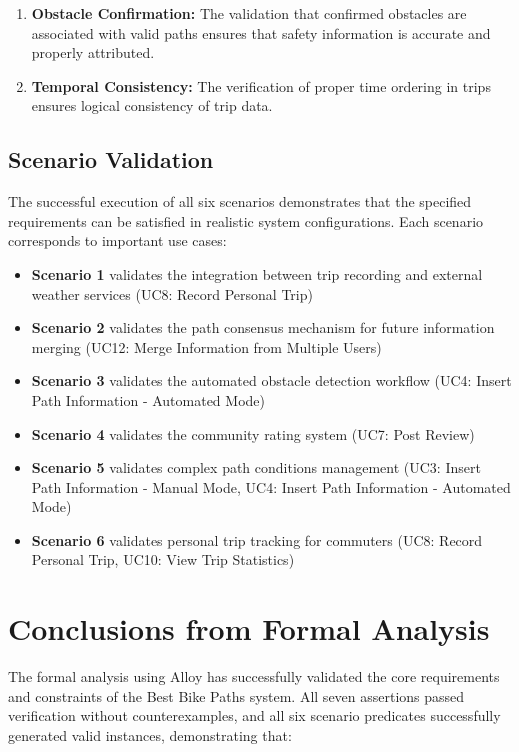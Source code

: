 \begin{enumerate}
    \item \textbf{Obstacle Confirmation:} The validation that confirmed obstacles are associated with valid paths ensures that safety information is accurate and properly attributed.
    
    \item \textbf{Temporal Consistency:} The verification of proper time ordering in trips ensures logical consistency of trip data.
\end{enumerate}

\subsection{Scenario Validation}
\label{subsec:scenario_validation}%

The successful execution of all six scenarios demonstrates that the specified requirements can be satisfied in realistic system configurations. Each scenario corresponds to important use cases:

\begin{itemize}
    \item \textbf{Scenario 1} validates the integration between trip recording and external weather services (UC8: Record Personal Trip)
    \item \textbf{Scenario 2} validates the path consensus mechanism for future information merging (UC12: Merge Information from Multiple Users)
    \item \textbf{Scenario 3} validates the automated obstacle detection workflow (UC4: Insert Path Information - Automated Mode)
    \item \textbf{Scenario 4} validates the community rating system (UC7: Post Review)
    \item \textbf{Scenario 5} validates complex path conditions management (UC3: Insert Path Information - Manual Mode, UC4: Insert Path Information - Automated Mode)
    \item \textbf{Scenario 6} validates personal trip tracking for commuters (UC8: Record Personal Trip, UC10: View Trip Statistics)
\end{itemize}

\section{Conclusions from Formal Analysis}
\label{sec:conclusions_formal_analysis}%

The formal analysis using Alloy has successfully validated the core requirements and constraints of the Best Bike Paths system. All seven assertions passed verification without counterexamples, and all six scenario predicates successfully generated valid instances, demonstrating that:

